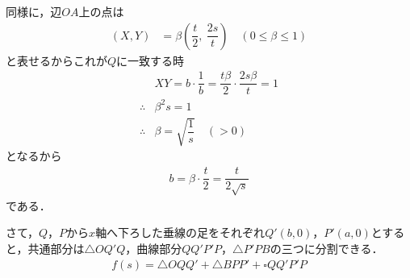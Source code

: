 \documentclass[../../main.tex]{subfiles}
\begin{document}
同様に，辺$OA$上の点は
\begin{align}
  (X,Y)&=\beta\left(\dfrac{t}{2},\ \dfrac{2s}{t}\right) \quad (0 \le \beta \le 1)
\end{align}
と表せるからこれが$Q$に一致する時
\begin{align}
  & XY = b\cdot\dfrac{1}{b} = \dfrac{t\beta}{2}\cdot\dfrac{2s\beta}{t} = 1 \\
  \therefore
  & \beta^2s = 1 \\
  \therefore
  & \beta = \sqrt{\dfrac{1}{s}} \quad (>0)
\end{align}
となるから
\begin{align}
  b = \beta\cdot\dfrac{t}{2}=\dfrac{t}{2\sqrt{s}} \label{eq:10}
\end{align}
である．

さて，$Q$，$P$から$x$軸へ下ろした垂線の足をそれぞれ$Q'(b,0)$，$P'(a,0)$とすると，共通部分は$\triangle OQ'Q$，曲線部分$QQ'P'P$，$\triangle P'PB$の三つに分割できる．
\begin{align}
  f(s) = \triangle OQQ' + \triangle BPP' + \square QQ'P'P \label{eq:11}
\end{align}
\end{document}
